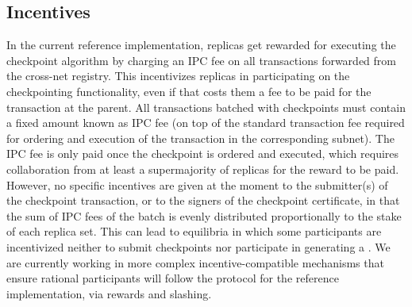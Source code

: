 \subsection{Incentives} 
In the current reference implementation, replicas get rewarded for executing the checkpoint algorithm by charging an IPC fee on all transactions forwarded from the cross-net registry. This incentivizes replicas in participating on the checkpointing functionality, even if that costs them a fee to be paid for the transaction at the parent. All transactions batched with checkpoints must contain a fixed amount known as IPC fee (on top of the standard transaction fee required for ordering and execution of the transaction in the corresponding subnet). The IPC fee is only paid once the checkpoint is ordered and executed, which requires collaboration from at least a supermajority of replicas for the reward to be paid. However, no specific incentives are given at the moment to the submitter(s) of the checkpoint transaction, or to the signers of the checkpoint certificate, in that the sum of IPC fees of the batch is evenly distributed proportionally to the stake of each replica set. This can lead to equilibria in which some participants are incentivized neither to submit checkpoints nor participate in generating a 
\pof. We are currently working in more complex incentive-compatible mechanisms that ensure rational participants will follow the protocol for the reference implementation, via rewards and slashing.

